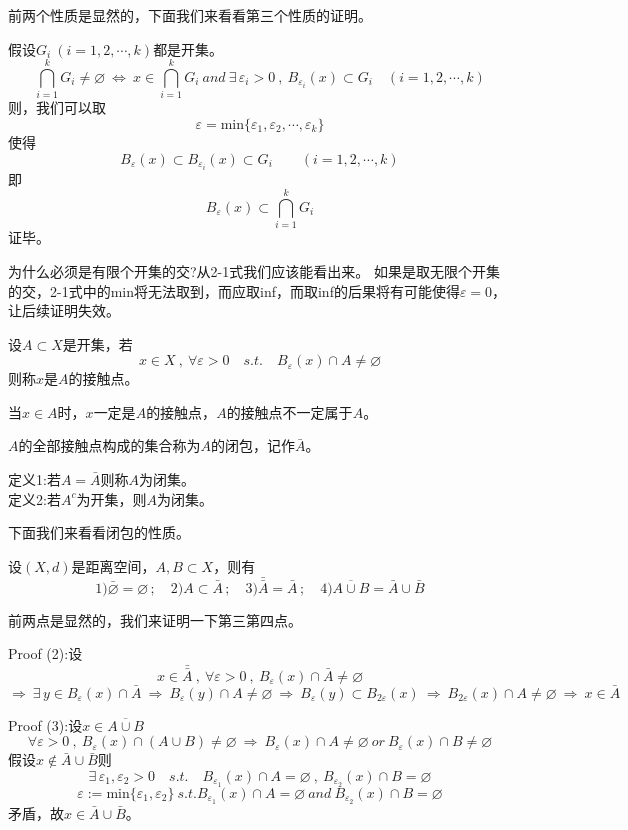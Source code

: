 前两个性质是显然的，下面我们来看看第三个性质的证明。

假设$G_i \ (i=1,2,\cdots,k)$都是开集。
\[\bigcap_{i=1}^kG_i \neq \varnothing \ \Leftrightarrow \ x \in \bigcap_{i=1}^kG_i \ and \ \exists \, \varepsilon_i >0 \ , \ B_{\varepsilon_i}(x) \subset G_i \quad (i=1,2,\cdots,k)\]
则，我们可以取
\[\varepsilon=\text{min}\{\varepsilon_1,\varepsilon_2,\cdots,\varepsilon_k\} \tag{2-1}\]
使得
\[B_{\varepsilon}(x) \subset B_{\varepsilon_i}(x) \subset G_i \qquad (i=1,2,\cdots,k)\]
即
\[B_{\varepsilon}(x) \subset \bigcap_{i=1}^kG_i\]
证毕。

为什么必须是有限个开集的交?从2-1式我们应该能看出来。
如果是取无限个开集的交，2-1式中的min将无法取到，而应取inf，而取inf的后果将有可能使得$\varepsilon=0$，让后续证明失效。
\begin{definition}[接触点]
    设$A \subset X$是开集，若
    \[x \in X \ , \ \forall \varepsilon>0 \quad s.t. \quad B_{\varepsilon}(x) \cap A \neq \varnothing\]
    则称$x$是$A$的接触点。
\end{definition}

当$x \in A$时，$x$一定是$A$的接触点，$A$的接触点不一定属于$A$。

\begin{definition}[闭包]
    $A$的全部接触点构成的集合称为$A$的闭包，记作$\bar{A}$。
\end{definition}
\begin{definition}[闭集]
    定义1:若$A=\bar{A}$则称$A$为闭集。\\
    定义2:若$A^c$为开集，则$A$为闭集。
\end{definition}

下面我们来看看闭包的性质。
\begin{theorem}
    设$(X,d)$是距离空间，$A,B \subset X$，则有
    \[1)\bar{\varnothing}=\varnothing \, ; \quad 2)A \subset \bar{A} \, ; \quad 3)\bar{\bar{A}}=\bar{A} \, ; \quad 4)\overline{A \cup B}=\bar{A} \cup \bar{B}\]
\end{theorem}

前两点是显然的，我们来证明一下第三第四点。

Proof (2):设
\[x \in \bar{\bar{A}} \ , \ \forall \varepsilon>0 \ , \ B_{\varepsilon}(x) \cap \bar{A} \neq \varnothing\]
\[\Rightarrow \ \exists \, y \in B_{\varepsilon}(x) \cap \bar{A} \ \Rightarrow \ B_{\varepsilon}(y) \cap A \neq \varnothing \ \Rightarrow \ B_{\varepsilon}(y) \subset B_{2\varepsilon}(x) \ \Rightarrow \ B_{2\varepsilon}(x) \cap A \neq \varnothing \ \Rightarrow \ x \in \bar{A}\]

Proof (3):设$x \in \overline{A \cup B}$
\[\forall \varepsilon>0 \ , \ B_{\varepsilon}(x) \cap (A \cup B) \neq \varnothing \ \Rightarrow \ B_{\varepsilon}(x) \cap A \neq \varnothing \ or \ B_{\varepsilon}(x) \cap B \neq \varnothing\]
假设$x \notin \bar{A} \cup \bar{B}$则
\[\exists \, \varepsilon_1,\varepsilon_2>0 \quad s.t. \quad B_{\varepsilon_1}(x) \cap A=\varnothing \ , \ B_{\varepsilon_2}(x) \cap B=\varnothing\]
\[\varepsilon:=\text{min}\{\varepsilon_1,\varepsilon_2\} \ s.t. B_{\varepsilon_1}(x) \cap A=\varnothing \ and \ B_{\varepsilon_2}(x) \cap B=\varnothing\]
矛盾，故$x \in \bar{A} \cup \bar{B}$。

